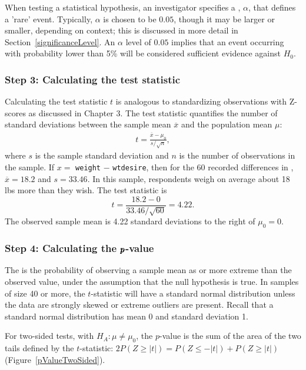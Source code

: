 When testing a statistical hypothesis, an investigator specifies a , $\alpha$, that defines a 'rare' event. Typically, $\alpha$ is chosen to be $0.05$, though it may be larger or smaller, depending on context; this is discussed in more detail in Section~\ref{significanceLevel}. An $\alpha$ level of $0.05$ implies that an event occurring with probability lower than 5\% will be considered sufficient evidence against $H_0$.


\subsubsection{Step 3: Calculating the test statistic}

Calculating the test statistic $t$ is analogous to standardizing observations with Z-scores as discussed in Chapter 3. The test statistic quantifies the number of standard deviations between the sample mean $\overline{x}$ and the population mean $\mu$:
\begin{align*}
t=\frac{\overline{x}-\mu_0}{s/\sqrt{n}},
\end{align*}
where $s$ is the sample standard deviation and $n$ is the number of observations in the sample.  If $x =$ \texttt{weight} $-$ \texttt{wtdesire}, then for the 60 recorded differences in , $\overline{x} = 18.2$ and $s = 33.46$.  In this sample, respondents weigh on average about 18 lbs more than they wish. The test statistic is 
\[t = \frac{18.2 - 0}{33.46/\sqrt{60}} = 4.22.\]
The observed sample mean is 4.22 standard deviations to the right of $\mu_0 = 0$.


\textD{\newpage}


\subsubsection{Step 4: Calculating the $\pmb{\MakeLowercase{p}}$-value}

The  is the probability of observing a sample mean as or more extreme than the observed value, under the assumption that the null hypothesis is true. In samples of size 40 or more, the $t$-statistic will have a standard normal distribution unless the data are strongly skewed or extreme outliers are present. Recall that a standard normal distribution has mean 0 and standard deviation 1.

For two-sided tests, with $H_A: \mu \neq \mu_0$, the $p$-value is the sum of the area of the two tails defined by the $t$-statistic: $2 P(Z \geq |t|) = P(Z \leq -|t|) + P(Z \geq |t|)$ (Figure~\ref{pValueTwoSided}).

